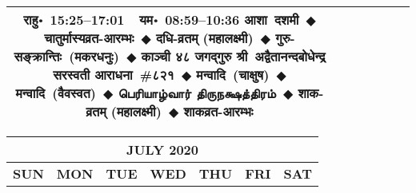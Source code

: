 \documentclass[a3paper,12pt,landscape]{article}
\newcommand{\eventsep}{~$\Diamondblack$ }
\newcommand{\To}{\hspace{1pt}\raisebox{0pt}{\tiny\RIGHTarrow}\hspace{1pt}}
\newcommand{\tamil}[1]{%
{\fontspec[Scale=0.9,FakeStretch=0.9]{Noto Sans Tamil} \footnotesize #1}}
\newcommand{\rahuyama}[2]{%
{राहु॰~\textsf{#1}~~यम॰~\textsf{#2}}
}
\begin{document}
\begin{center}
\begin{tabular}{|c|c|c|c|c|c|c|}
{\rahuyama{15:25--17:01}{08:59--10:36}}%
{आशा~दशमी\eventsep चातुर्मास्यव्रत-आरम्भः\eventsep दधि-व्रतम् (महालक्ष्मी)\eventsep गुरु-सङ्क्रान्तिः~(मकर\To{}धनुः)\eventsep काञ्ची ४८ जगद्गुरु श्री~अद्वैतानन्दबोधेन्द्र सरस्वती आराधना~\#{८२१}\eventsep मन्वादि~(चाक्षुष)\eventsep मन्वादि~(वैवस्वत)\eventsep \tamil{பெரியாழ்வார் திருநக்ஷத்திரம்}\eventsep शाक-व्रतम् (महालक्ष्मी)\eventsep शाकव्रत-आरम्भः}
&
\mbox{}  & %
\mbox{}  & %
\mbox{}  & %
\\ \hline
\end{tabular}



\begin{tabular}{|c|c|c|c|c|c|c|}
\multicolumn{7}{c}{\Large \bfseries \sffamily JULY 2020}\\[3mm]
\hline
\textbf{\textsf{SUN}} & \textbf{\textsf{MON}} & \textbf{\textsf{TUE}} & \textbf{\textsf{WED}} & \textbf{\textsf{THU}} & \textbf{\textsf{FRI}} & \textbf{\textsf{SAT}} \\ \hline


\end{tabular}
\end{center}
\end{document}
